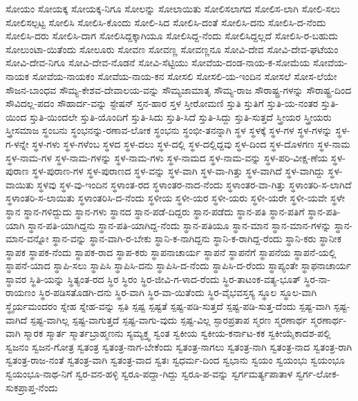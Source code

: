 {ಸೋಯಂ
ಸೋಯಕ್ಕ
ಸೋಯಕ್ಕ-ನಿಗೂ
ಸೋಲನ್ನು
ಸೋಲಾಯಿತು
ಸೋಲಿಸಲಾಗದ
ಸೋಲಿಸ-ಲಾಗಿ
ಸೋಲಿ-ಸಲು
ಸೋಲಿಸಲ್ಪಟ್ಟ
ಸೋಲಿಸಿ
ಸೋಲಿಸಿ-ಕೊಂದು
ಸೋಲಿ-ಸಿದ
ಸೋಲಿಸಿ-ದಂತೆ
ಸೋಲಿಸಿ-ದನು
ಸೋಲಿಸಿ-ದ-ನೆಂದು
ಸೋಲಿಸಿ-ದರು
ಸೋಲಿಸಿ-ದಾಗ
ಸೋಲಿಸಿದ್ದಕ್ಕಾಗಿಯೂ
ಸೋಲಿಸಿದ್ದ-ನೆಂದು
ಸೋಲಿಸಿದ್ದಲ್ಲದೆ
ಸೋಲಿಸಿ-ರ-ಬಹುದು
ಸೋಲುಂಟಾ-ಯಿತೆಂದು
ಸೋಲೂರು
ಸೋವಣ
ಸೋವಣ್ಣ
ಸೋವಣ್ಣನೂ
ಸೋವಿ-ದೇವ
ಸೋವಿ-ದೇವ-ಘಟೆಯಂ
ಸೋವಿ-ದೇವ-ನಿಗೂ
ಸೋವಿ-ದೇವ-ನೊಡನೆ
ಸೋವಿ-ಸೆಟ್ಟಿಯು
ಸೋವೆಯ-ದಂಡ-ನಾಯ-ಕ-ಸೋಮೆಯ
ಸೋವೆಯ-ನಾಯಕ
ಸೋವೆಯ-ನಾಯಕಂ
ಸೋವೆಯ-ನಾಯ-ಕನ
ಸೋಸಲಿ
ಸೋಸಲಿ-ಯ-ಇಂದಿನ
ಸೋಸಲೆ
ಸೋಸ-ಲೆಯೇ
ಸೌಜನ-ಬಾಂಧವ
ಸೌಮ್ಯ-ಕೇಶವ-ದೇವಾಲಯ-ವನ್ನು
ಸೌಮ್ಯಜಾಮಾತೃ
ಸೌಮ್ಯ-ರಾಜ
ಸೌರಾಷ್ಟ್ರ-ಗಳನ್ನು
ಸೌರಾಷ್ಟ್ರ-ದಿಂದ
ಸೌವಿದಲ್ಲ-ಪದಂ
ಸೌಹಾರ್ದ-ವನ್ನು
ಸ್ಟೇಷನ್
ಸ್ತನ-ಹಾರ
ಸ್ತಳ
ಸ್ತೀರೋಮಣಿ
ಸ್ತುತಿ
ಸ್ತುತಿಗೆ
ಸ್ತುತಿ-ಯ-ನಂತರ
ಸ್ತುತಿ-ಯಿಂದ
ಸ್ತುತಿ-ಯಿಂದಲೇ
ಸ್ತುತಿ-ಯೊಂದಿಗೆ
ಸ್ತುತಿ-ಸಿದು
ಸ್ತುತಿ-ಸಿದೆ
ಸ್ತುತಿ-ಸಿದ್ದು
ಸ್ತುತಿ-ಸುತ್ತದೆ
ಸ್ತ್ರೀಯರ
ಸ್ತ್ರೀಯರು
ಸ್ತ್ರೀಸಮಾಜ
ಸ್ಥಂಬನು
ಸ್ಥಂಭನನ್ನು-ರಣಾವ-ಲೋಕ
ಸ್ಥಂಭನು
ಸ್ಥಂಭೀ-ತನನ್ನಾಗಿ
ಸ್ಥಳ
ಸ್ಥಳಕ್ಕೆ
ಸ್ಥಳ-ಗಳ
ಸ್ಥಳ-ಗಳನ್ನು
ಸ್ಥಳ-ಗ-ಳನ್ನೇ
ಸ್ಥಳ-ಗಳು
ಸ್ಥಳ-ಗಳೆಂಬ
ಸ್ಥಳದ
ಸ್ಥಳ-ದಲು
ಸ್ಥಳ-ದಲ್ಲಿ
ಸ್ಥಳ-ದಲ್ಲಿದ್ದವು
ಸ್ಥಳ-ದಿಂದ
ಸ್ಥಳ-ದೊಳಗಣ
ಸ್ಥಳ-ನಾಮ
ಸ್ಥಳ-ನಾಮ-ಗಳ
ಸ್ಥಳ-ನಾಮ-ಗಳನ್ನು
ಸ್ಥಳ-ನಾಮ-ಗಳು
ಸ್ಥಳ-ನಾಮದ
ಸ್ಥಳ-ನಾಮ-ವನ್ನು
ಸ್ಥಳ-ಪರಿ-ವೀಕ್ಷ-ಣೆಯ
ಸ್ಥಳ-ಪುರಾಣ
ಸ್ಥಳ-ಪುರಾಣ-ಗಳ
ಸ್ಥಳ-ಪುರಾಣದ
ಸ್ಥಳ-ವನ್ನು
ಸ್ಥಳ-ವಾಗಿ
ಸ್ಥಳ-ವಾ-ಗಿತ್ತು
ಸ್ಥಳ-ವಾಗಿದೆ
ಸ್ಥಳ-ವಾಗಿದ್ದು
ಸ್ಥಳ-ವಾಯಿತು
ಸ್ಥಳವು
ಸ್ಥಳ-ವು-ಇಂದಿನ
ಸ್ಥಳಾಂತ-ರದ
ಸ್ಥಳಾಂತರ-ನಾದ-ನೆಂದು
ಸ್ಥಳಾಂತರ-ವಾ-ಗಿತ್ತು
ಸ್ಥಳಾಂತರಿ-ಸ-ಲಾಗಿದೆ
ಸ್ಥಳಾಂತರಿ-ಸ-ಲಾಯಿತು
ಸ್ಥಳಾಂತರಿಸಿ-ದ-ನೆಂದು
ಸ್ಥಳೀಯ
ಸ್ಥಳೀ-ಯರ
ಸ್ಥಳೀ-ಯರು
ಸ್ಥಳೀ-ಯರೇ
ಸ್ಥಳೀ-ಯವೇ
ಸ್ಥಳೇ
ಸ್ಥಾನ
ಸ್ಥಾನ-ಗಳಿದ್ದುದು
ಸ್ಥಾನ-ಗಳು
ಸ್ಥಾನದ
ಸ್ಥಾನ-ಪಡೆ-ದಿದ್ದರು
ಸ್ಥಾನ-ಪಡೆದು
ಸ್ಥಾನ-ಪತಿ
ಸ್ಥಾನ-ಪತಿಗೆ
ಸ್ಥಾನ-ಪತಿ-ಯಾಗಿ
ಸ್ಥಾನ-ಪತಿ-ಯಾಗಿದ್ದನು
ಸ್ಥಾನ-ಪತಿ-ಯಾಗಿದ್ದ-ನೆಂದು
ಸ್ಥಾನ-ಪತಿಯೂ
ಸ್ಥಾನ-ಮಾನ
ಸ್ಥಾನ-ಮಾನ-ಗಳನ್ನು
ಸ್ಥಾನ-ಮಾನ-ವನ್ನೋ
ಸ್ಥಾನ-ವನ್ನು
ಸ್ಥಾನ-ವಾಗಿ-ರ-ಬೇಕು
ಸ್ಥಾನಿ-ಕ-ನಾಗಿದ್ದನು
ಸ್ಥಾನಿ-ಕ-ರಾಗಿದ್ದ-ರೆಂದು
ಸ್ಥಾನಿ-ಕರು
ಸ್ಥಾನೀಕ
ಸ್ಥಾಪಕ
ಸ್ಥಾಪಕ-ನೆಂದು
ಸ್ಥಾಪಕ-ರಾದ
ಸ್ಥಾಪ-ಕರು
ಸ್ಥಾಪನಾಚಾರ್ಯ
ಸ್ಥಾಪನೆ
ಸ್ಥಾಪನೆಗೆ
ಸ್ಥಾಪನೆಯ
ಸ್ಥಾಪನೆ-ಯಲ್ಲಿ
ಸ್ಥಾಪನೆ-ಯಾದ
ಸ್ಥಾಪಿ-ಸಲು
ಸ್ಥಾಪಿಸಿ
ಸ್ಥಾಪಿಸಿ-ದನು
ಸ್ಥಾಪಿಸಿ-ದ-ನೆಂದು
ಸ್ಥಾಪಿಸಿ-ದ-ರೆಂದು
ಸ್ಥಾಪ್ಯಂತೇ
ಸ್ಥಾಫನಾಚಾರ್ಯ
ಸ್ಥಾವರ
ಸ್ಥಿತಿ-ಯನ್ನು
ಸ್ಥಿತ್ಯಂತ-ರದ
ಸ್ಥಿರ
ಸ್ಥಿರಂ
ಸ್ಥಿರ-ಜೀವಿ-ಗ-ಳಾದ-ರೆಂದು
ಸ್ಥಿರ-ತಾಟಂಕ-ವತ್ಯ-ಭೂತ್
ಸ್ಥಿರ-ನಾ-ರಾಯಣಂ
ಸ್ಥಿರ-ಪಡಿಸತೊಡಗಿ-ದನು
ಸ್ಥಿರ-ವಾಗಿ
ಸ್ಥಿರ-ವಾ-ಯಿತೆಂದು
ಸ್ಥಿರ-ವೈಭವಸ್ತಸ್ಯ
ಸ್ಥೂಲ
ಸ್ಥೂಲ-ವಾಗಿ
ಸ್ಥೈರ್ಯಮಂದರಂ
ಸ್ನೇಹ
ಸ್ನೇಹ-ವನ್ನು
ಸ್ಪತಿ
ಸ್ಪಷ್ಟ
ಸ್ಪಷ್ಟತೆ
ಸ್ಪಷ್ಟ-ಪಡಿ-ಸುತ್ತದೆ
ಸ್ಪಷ್ಟ-ಪಡಿ-ಸುತ್ತ-ದೆಂದು
ಸ್ಪಷ್ಟ-ವಾಗಿ
ಸ್ಪಷ್ಟ-ವಾಗಿದೆ
ಸ್ಪಷ್ಟ-ವಾಗಿಲ್ಲ
ಸ್ಪಷ್ಟ-ವಾಗುತ್ತದೆ
ಸ್ಪಷ್ಟ-ವಾಗು-ವುದು
ಸ್ಪಷ್ಟ-ವಿಲ್ಲ
ಸ್ಫಾರಪ್ರತಾಪ
ಸ್ಮರಣ
ಸ್ಮರಣಾರ್ಥ
ಸ್ಮರಣಾರ್ಥ-ವಾಗಿ
ಸ್ಮಾರಕ
ಸ್ಮಾರ್ತ
ಸ್ಮಾರ್ತಬ್ರಾಹ್ಮಣನು
ಸ್ಯಮ್ಯಕ್ತ್ವ
ಸ್ವಂತ
ಸ್ವಕೀಯ
ಸ್ವಕೀಯ-ಕರ್ನಾಟ-ಕಕ
ಸ್ವಕೀಯೈಕಾದಶ-ಪಲ್ಲಿ
ಸ್ವಜನಂ
ಸ್ವಜನ-ಗೋತ್ರ
ಸ್ವತಂತ್ರ
ಸ್ವತಂತ್ರ-ನಾಗ-ಬೇಕೆಂದು
ಸ್ವತಂತ್ರ-ನಾಗಲು
ಸ್ವತಂತ್ರ-ನಾಗಿ
ಸ್ವತಂತ್ರ-ನಾದ
ಸ್ವತಂತ್ರ-ರಾಗಿ
ಸ್ವತಂತ್ರ-ರಾಜ-ನಂತೆ
ಸ್ವತಂತ್ರ-ವಾಗಿ
ಸ್ವತಂತ್ರ-ವಾದ
ಸ್ವತಃ
ಸ್ವಧರ್ಮ-ದಿಂದ
ಸ್ವಭಾನು
ಸ್ವಯಂ
ಸ್ವಯಂಭು
ಸ್ವಯಂಭೂ
ಸ್ವಯಂಭೂ-ನಾಥ-ನಿಗೆ
ಸ್ವರ-ವನ-ಹಳ್ಳಿ
ಸ್ವರೂ-ಪದ್ದಾ-ಗಿದ್ದು
ಸ್ವರೂ-ಪ-ವನ್ನು
ಸ್ವರ್ಗಮರ್ತ್ಯಪಾತಾಳ
ಸ್ವರ್ಗ-ಲೋಕ-ಸುಕಪ್ರಾಪ್ತ-ನೆಂದು
}
